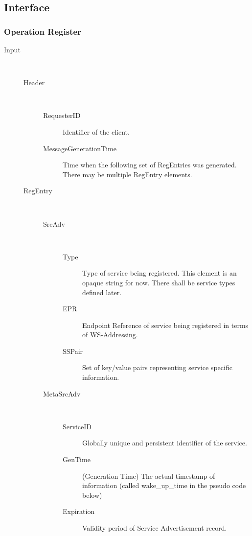 \documentclass{book}
\begin{document}
\subsection{Interface} 
\label{sub:isis_interface}

\subsubsection{Operation Register}

\begin{description}

  \item[Input]~\begin{description}
    \item[Header]~\begin{description}
      \item[RequesterID] Identifier of the client.
      \item[MessageGenerationTime] Time when the following set of RegEntries was generated. There may be multiple RegEntry elements.
    \end{description}
    \item[RegEntry]~\begin{description}
      \item[SrcAdv]~\begin{description}
        \item[Type] Type of service being registered. This element is an opaque string for now. There shall be service types defined later.
        \item[EPR] Endpoint Reference of service being registered in terms of WS-Addressing.
        \item[SSPair] Set of key/value pairs representing service specific information.
      \end{description}
      \item[MetaSrcAdv]~\begin{description}
        \item[ServiceID] Globally unique and persistent identifier of the service.
        \item[GenTime] (Generation Time) The actual timestamp of information (called wake\_up\_time in the pseudo code below)
        \item[Expiration] Validity period of Service Advertisement record.
      \end{description}
    \end{description}
  \end{description}


\end{description}
\end{document}
